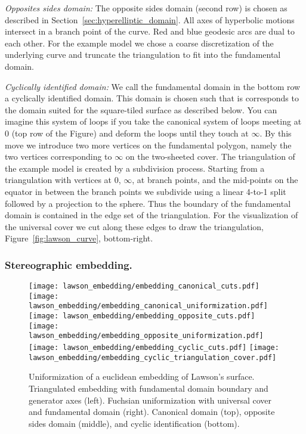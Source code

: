 \documentclass[Thesis.tex]{subfiles}
\begin{document}
  \textit{Opposites sides domain:}
  The opposite sides domain (second row) is chosen as described in Section~\ref{sec:hyperelliptic_domain}.
  All axes of hyperbolic motions intersect in a branch point of the curve.
  Red and blue geodesic arcs are dual to each other.
  For the example model we chose a coarse discretization of the underlying curve and truncate the triangulation to fit into the fundamental domain.

  \textit{Cyclically identified domain:}
  We call the fundamental domain in the bottom row a cyclically identified domain.
  This domain is chosen such that is corresponds to the domain suited for the square-tiled surface as described below.
  You can imagine this system of loops if you take the canonical system of loops meeting at $0$ (top row of the Figure) and deform the loops until they touch at $\infty$.
  By this move we introduce two more vertices on the fundamental polygon, namely the two vertices corresponding to $\infty$ on the two-sheeted cover.
  The triangulation of the example model is created by a subdivision process.
  Starting from  a triangulation with vertices at $0$, $\infty$, at branch points, and the mid-points on the equator in between the branch points we subdivide using a linear 4-to-1 split followed by a projection to the sphere. Thus the boundary of the fundamental domain is contained in the edge set of the triangulation. For the visualization of the universal cover we cut along these edges to draw the triangulation, Figure~\ref{fig:lawson_curve}, bottom-right.

  \subsubsection{Stereographic embedding.}

  \begin{figure}
  	\centering
  	\resizebox{!}{6cm} {
  	\texttt{[image: lawson\_embedding/embedding\_canonical\_cuts.pdf]}
  	\texttt{[image: lawson\_embedding/embedding\_canonical\_uniformization.pdf]}
  	}
  	\resizebox{!}{6cm} {
  	\texttt{[image: lawson\_embedding/embedding\_opposite\_cuts.pdf]}
  	\texttt{[image: lawson\_embedding/embedding\_opposite\_uniformization.pdf]}
  	}
  	\resizebox{!}{6.5cm} {
  	\texttt{[image: lawson\_embedding/embedding\_cyclic\_cuts.pdf]}
  	\texttt{[image: lawson\_embedding/embedding\_cyclic\_triangulation\_cover.pdf]}
  	}
  	\caption{Uniformization of a euclidean embedding of Lawson's surface. Triangulated embedding with fundamental domain boundary and generator axes (left). Fuchsian uniformization with universal cover and fundamental domain (right). Canonical domain (top), opposite sides domain (middle), and cyclic identification (bottom).}
  	\label{fig:lawson_embedding}
  \end{figure}
\end{document}
